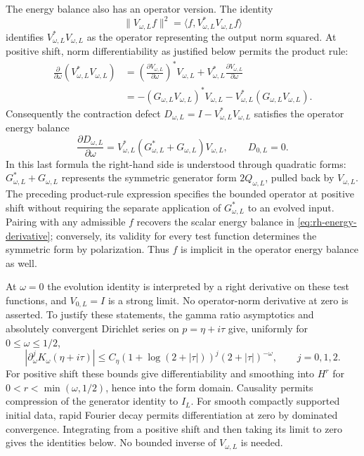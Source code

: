 The energy balance also has an operator version. The identity
\[
\lVert V_{\omega,L}f\rVert^2
=\langle f,V_{\omega,L}^*V_{\omega,L}f\rangle
\]
identifies $V_{\omega,L}^*V_{\omega,L}$ as the operator representing
the output norm squared. At positive shift, norm differentiability
as justified below permits the product rule:
\begin{align*}
\frac{\partial}{\partial\omega}(V_{\omega,L}^*V_{\omega,L})
&=\left(\frac{\partial V_{\omega,L}}{\partial\omega}\right)^*
  V_{\omega,L}
 +V_{\omega,L}^*\frac{\partial V_{\omega,L}}{\partial\omega}\\
&=-(G_{\omega,L}V_{\omega,L})^*V_{\omega,L}
  -V_{\omega,L}^*(G_{\omega,L}V_{\omega,L}).
\end{align*}
Consequently the contraction defect
$D_{\omega,L}=I-V_{\omega,L}^*V_{\omega,L}$ satisfies the operator
energy balance
\[
\boxed{\frac{\partial D_{\omega,L}}{\partial\omega}
=V_{\omega,L}^*(G_{\omega,L}^*+G_{\omega,L})V_{\omega,L},
\qquad D_{0,L}=0.}
\]
In this last formula the right-hand side is understood through
quadratic forms: $G_{\omega,L}^*+G_{\omega,L}$ represents the
symmetric generator form $2Q_{\omega,L}$, pulled back by
$V_{\omega,L}$. The preceding product-rule expression specifies the
bounded operator at positive shift without requiring the separate
application of $G_{\omega,L}^*$ to an evolved input.
Pairing with any admissible $f$ recovers the scalar energy balance
in \eqref{eq:rh-energy-derivative}; conversely, its validity for every
test function determines the symmetric form by polarization.
Thus $f$ is implicit in the operator energy balance as well.

At $\omega=0$ the evolution identity is interpreted by a right
derivative on these test functions, and $V_{0,L}=I$ is a strong
limit. No operator-norm derivative at zero is asserted.
To justify these statements, the gamma ratio
asymptotics and absolutely convergent Dirichlet series on
$p=\eta+i\tau$ give, uniformly for $0\leq\omega\leq1/2$,
\[
|\partial_\omega^jK_\omega(\eta+i\tau)|
\leq C_\eta(1+\log(2+|\tau|))^j(2+|\tau|)^{-\omega},
\qquad j=0,1,2.
\]
For positive shift these bounds give differentiability and smoothing
into $H^r$ for $0<r<\min(\omega,1/2)$, hence into the form domain.
Causality permits compression of the generator identity to $I_L$.
For smooth compactly supported initial data, rapid Fourier decay permits
differentiation at zero by dominated convergence. Integrating from a
positive shift and then taking its limit to zero gives the identities
below. No bounded inverse of $V_{\omega,L}$ is needed.

